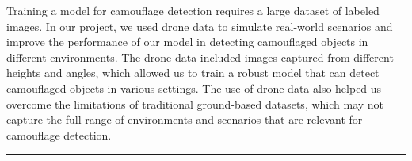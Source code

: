 \begin{multicols}{2}
Training a model for camouflage detection requires a large dataset of labeled images. In our project, we used drone data\cite{drones6100308} to simulate real-world scenarios and improve the performance of our model in detecting camouflaged objects in different environments. The drone data included images captured from different heights and angles, which allowed us to train a robust model that can detect camouflaged objects in various settings. The use of drone data also helped us overcome the limitations of traditional ground-based datasets, which may not capture the full range of environments and scenarios that are relevant for camouflage detection.
\end{multicols}

\vspace{0.5cm}
{\color{gray}\hrule}
\vspace{0.5cm}
